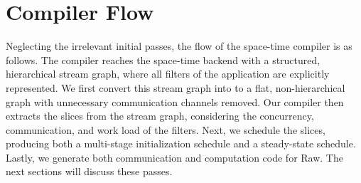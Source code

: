 \section{Compiler Flow}
Neglecting the irrelevant initial passes, the flow of the space-time
compiler is as follows.  The compiler reaches the space-time backend
with a structured, hierarchical stream graph, where all filters of the
application are explicitly represented.  We first convert this stream
graph into to a flat, non-hierarchical graph with unnecessary
communication channels removed.  Our compiler then extracts the
slices from the stream graph, considering the concurrency,
communication, and work load of the filters.
Next, we schedule the slices, producing both a multi-stage
initialization schedule and a steady-state schedule.  Lastly, we
generate both communication and computation code for Raw.  The next
sections will discuss these passes.
